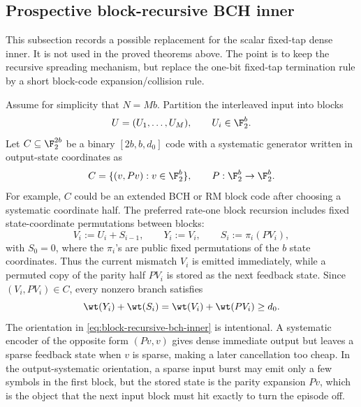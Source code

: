 \subsection{Prospective block-recursive BCH inner}
\label{subsec:block-recursive-bch-inner}

This subsection records a possible replacement for the scalar fixed-tap dense inner.  It is not used in the proved
theorems above.  The point is to keep the recursive spreading mechanism, but replace the one-bit fixed-tap termination
rule by a short block-code expansion/collision rule.

Assume for simplicity that \(N=Mb\).  Partition the interleaved input into blocks
\[
U=(U_1,\ldots,U_M),\qquad U_i\in\F_2^b.
\]
Let \(C\subseteq\F_2^{2b}\) be a binary \([2b,b,d_0]\) code with a systematic generator written in
output-state coordinates as
\[
C=\{(v,Pv):v\in\F_2^b\},
\qquad
P:\F_2^b\to\F_2^b.
\]
For example, \(C\) could be an extended BCH or RM block code after choosing a systematic coordinate half.  The preferred
rate-one block recursion includes fixed state-coordinate permutations between blocks:
\begin{equation}
\label{eq:block-recursive-bch-inner}
V_i := U_i+S_{i-1},\qquad
Y_i := V_i,\qquad
S_i := \pi_i(P V_i),
\end{equation}
with \(S_0=0\), where the \(\pi_i\)'s are public fixed permutations of the \(b\) state coordinates.  Thus the current
mismatch \(V_i\) is emitted immediately, while a permuted copy of the parity half \(PV_i\) is stored as the next
feedback state.  Since \((V_i,PV_i)\in C\), every nonzero branch satisfies
\[
\wt(Y_i)+\wt(S_i)=\wt(V_i)+\wt(PV_i)\ge d_0.
\]
The orientation in \eqref{eq:block-recursive-bch-inner} is intentional.  A systematic encoder of the opposite form
\((Pv,v)\) gives dense immediate output but leaves a sparse feedback state when \(v\) is sparse, making a later
cancellation too cheap.  In the output-systematic orientation, a sparse input burst may emit only a few symbols in the
first block, but the stored state is the parity expansion \(Pv\), which is the object that the next input block must
hit exactly to turn the episode off.

